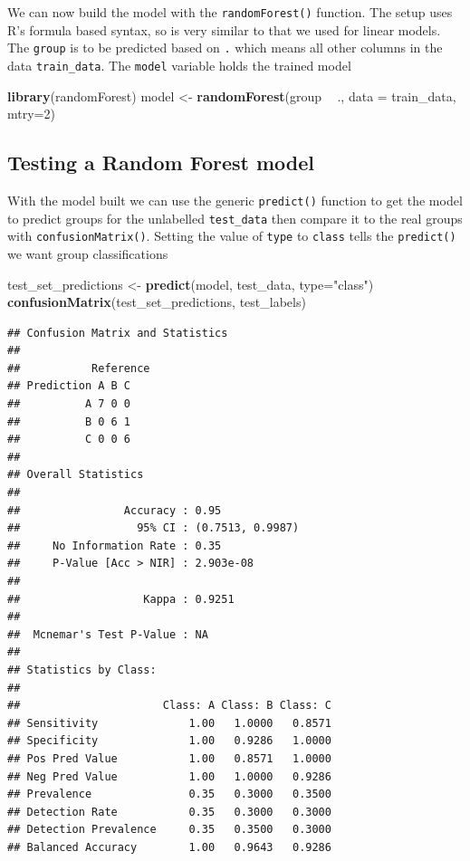 \documentclass[
]{book}
\newenvironment{Shaded}{\begin{snugshade}}{\end{snugshade}}
\newcommand{\DataTypeTok}[1]{\textcolor[rgb]{0.13,0.29,0.53}{#1}}
\newcommand{\DecValTok}[1]{\textcolor[rgb]{0.00,0.00,0.81}{#1}}
\newcommand{\KeywordTok}[1]{\textcolor[rgb]{0.13,0.29,0.53}{\textbf{#1}}}
\newcommand{\NormalTok}[1]{#1}
\newcommand{\OperatorTok}[1]{\textcolor[rgb]{0.81,0.36,0.00}{\textbf{#1}}}
\newcommand{\StringTok}[1]{\textcolor[rgb]{0.31,0.60,0.02}{#1}}
\begin{document}
We can now build the model with the \texttt{randomForest()} function. The setup uses R's formula based syntax, so is very similar to that we used for linear models. The \texttt{group} is to be predicted based on \texttt{.} which means all other columns in the data \texttt{train\_data}. The \texttt{model} variable holds the trained model

\begin{Shaded}
\begin{Highlighting}[]
\KeywordTok{library}\NormalTok{(randomForest)}
\NormalTok{model <-}\StringTok{ }\KeywordTok{randomForest}\NormalTok{(group }\OperatorTok{~}\StringTok{ }\NormalTok{., }\DataTypeTok{data =}\NormalTok{ train_data, }\DataTypeTok{mtry=}\DecValTok{2}\NormalTok{)}
\end{Highlighting}
\end{Shaded}

\hypertarget{testing-a-random-forest-model}{%
\subsection{Testing a Random Forest model}\label{testing-a-random-forest-model}}

With the model built we can use the generic \texttt{predict()} function to get the model to predict groups for the unlabelled \texttt{test\_data} then compare it to the real groups with \texttt{confusionMatrix()}. Setting the value of \texttt{type} to \texttt{class} tells the \texttt{predict()} we want group classifications

\begin{Shaded}
\begin{Highlighting}[]
\NormalTok{test_set_predictions <-}\StringTok{ }\KeywordTok{predict}\NormalTok{(model, test_data, }\DataTypeTok{type=}\StringTok{"class"}\NormalTok{)}
\KeywordTok{confusionMatrix}\NormalTok{(test_set_predictions, test_labels)}
\end{Highlighting}
\end{Shaded}

\begin{verbatim}
## Confusion Matrix and Statistics
## 
##           Reference
## Prediction A B C
##          A 7 0 0
##          B 0 6 1
##          C 0 0 6
## 
## Overall Statistics
##                                           
##                Accuracy : 0.95            
##                  95% CI : (0.7513, 0.9987)
##     No Information Rate : 0.35            
##     P-Value [Acc > NIR] : 2.903e-08       
##                                           
##                   Kappa : 0.9251          
##                                           
##  Mcnemar's Test P-Value : NA              
## 
## Statistics by Class:
## 
##                      Class: A Class: B Class: C
## Sensitivity              1.00   1.0000   0.8571
## Specificity              1.00   0.9286   1.0000
## Pos Pred Value           1.00   0.8571   1.0000
## Neg Pred Value           1.00   1.0000   0.9286
## Prevalence               0.35   0.3000   0.3500
## Detection Rate           0.35   0.3000   0.3000
## Detection Prevalence     0.35   0.3500   0.3000
## Balanced Accuracy        1.00   0.9643   0.9286
\end{verbatim}
\end{document}
